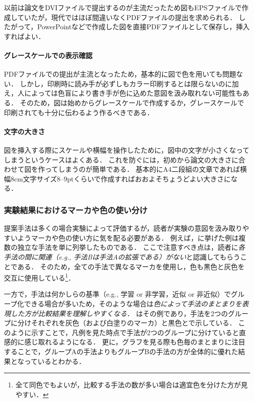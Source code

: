 以前は論文をDVIファイルで提出するのが主流だったため図もEPSファイルで作成していたが，現代ではほぼ間違いなくPDFファイルの提出を求められる．
したがって，PowerPointなどで作成した図を直接PDFファイルとして保存し，挿入すればよい．

\paragraph{グレースケールでの表示確認}

PDFファイルでの提出が主流となったため，基本的に図で色を用いても問題ない．
しかし，印刷時に読み手が必ずしもカラー印刷するとは限らないのに加え，人によっては色盲により書き手が色に込めた意図を汲み取れない可能性もある．
そのため，図は始めからグレースケールで作成するか，グレースケールで印刷されても十分に伝わるよう作るべきである．

\paragraph{文字の大きさ}

図を挿入する際にスケールや横幅を操作したために，図中の文字が小さくなってしまうというケースはよくある．
これを防ぐには，初めから論文の大きさに合わせて図を作ってしまうのが簡単である．
基本的にA4二段組の文章であれば横幅8cm文字サイズ8--9ptくらいで作成すればおおよそちょうどよい大きさになる．

\subsubsection{実験結果におけるマーカや色の使い分け}

提案手法は多くの場合実験によって評価するが，読者が実験の意図を汲み取りやすいようマーカや色の使い方に気を配る必要がある．
例えば，\Fig{\ref{fig:sample_independent}}に挙げた例は複数の独立な手法を単に列挙したものである．
ここで注意すべき点は，読者に\emph{各手法の間に関連（e.g., 手法Bは手法Aの拡張である）がない}と認識してもらうことである．
そのため，全ての手法で異なるマーカを使用し，色も黒色と灰色を交互に使用している\footnote{全て同色でもよいが，比較する手法の数が多い場合は適宜色を分けた方が見やすい．}．

一方で，手法は何かしらの基準（e.g., 学習 or 非学習，近似 or 非近似）でグループ化できる場合が多いため，そのような場合は\emph{色によって手法のまとまりを表現した方が比較結果を理解しやすくなる}．
\Fig{\ref{fig:sample_grouped}}はその例であり，手法を2つのグループに分けそれぞれを灰色（および白塗りのマーカ）と黒色とで示している．
このように示すことで，凡例を見た時点で手法が2つのグループに分けていると直感的に感じ取れるようになる．
更に，グラフを見る際も色毎のまとまりに注目することで，グループAの手法よりもグループBの手法の方が全体的に優れた結果となっているとわかる．

